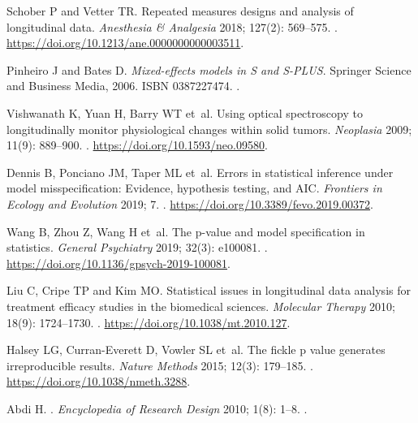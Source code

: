 \documentclass[Royal,times,doublespace,sagev]{sagej}
\begin{document}
\begin{thebibliography}{10}
Schober P and Vetter TR.
\newblock Repeated measures designs and analysis of longitudinal data.
\newblock \emph{Anesthesia {\&} Analgesia} 2018; 127(2): 569--575.
\newblock {}.
\newblock \urlprefix\url{https://doi.org/10.1213/ane.0000000000003511}.

Pinheiro J and Bates D.
\newblock \emph{{Mixed-effects models in S and S-PLUS}}.
\newblock Springer Science and Business Media, 2006.
\newblock ISBN 0387227474.
\newblock {}.

Vishwanath K, Yuan H, Barry WT et~al.
\newblock Using optical spectroscopy to longitudinally monitor physiological
  changes within solid tumors.
\newblock \emph{Neoplasia} 2009; 11(9): 889--900.
\newblock {}.
\newblock \urlprefix\url{https://doi.org/10.1593/neo.09580}.

Dennis B, Ponciano JM, Taper ML et~al.
\newblock Errors in statistical inference under model misspecification:
  Evidence, hypothesis testing, and {AIC}.
\newblock \emph{Frontiers in Ecology and Evolution} 2019; 7.
\newblock {}.
\newblock \urlprefix\url{https://doi.org/10.3389/fevo.2019.00372}.

Wang B, Zhou Z, Wang H et~al.
\newblock The p-value and model specification in statistics.
\newblock \emph{General Psychiatry} 2019; 32(3): e100081.
\newblock {}.
\newblock \urlprefix\url{https://doi.org/10.1136/gpsych-2019-100081}.

Liu C, Cripe TP and Kim MO.
\newblock Statistical issues in longitudinal data analysis for treatment
  efficacy studies in the biomedical sciences.
\newblock \emph{Molecular Therapy} 2010; 18(9): 1724--1730.
\newblock {}.
\newblock \urlprefix\url{https://doi.org/10.1038/mt.2010.127}.

Halsey LG, Curran-Everett D, Vowler SL et~al.
\newblock The fickle p value generates irreproducible results.
\newblock \emph{Nature Methods} 2015; 12(3): 179--185.
\newblock {}.
\newblock \urlprefix\url{https://doi.org/10.1038/nmeth.3288}.

Abdi H.
.
\newblock \emph{Encyclopedia of Research Design} 2010; 1(8): 1--8.
\newblock {}.


\end{thebibliography}
\end{document}

